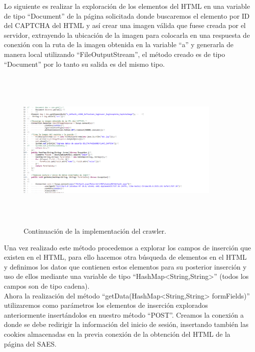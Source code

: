 	\noindent Lo siguiente es realizar la exploración de los elementos del HTML en una variable de tipo “Document” de la página solicitada donde buscaremos el elemento por ID del CAPTCHA del HTML y así crear una imagen válida que fuese creada por el servidor, extrayendo la ubicación de la imagen para colocarla en una respuesta de conexión con la ruta de la imagen obtenida en la variable “a” y generarla de manera local utilizando “FileOutputStream”, el método creado es de tipo “Document” por lo tanto su salida es del mismo tipo. 
	\pagebreak
	
	\begin{figure} [hbt!]
		\centering
		\includegraphics[width=10cm, height=8cm]{Imagenes/Crawler/Codigo2}
		\caption{Continuación de la implementación del crawler.}
		\label{codigo2}
	\end{figure}
	
	\noindent Una vez realizado este método procedemos a explorar los campos de inserción que existen en el HTML, para ello hacemos otra búsqueda de elementos en el HTML y definimos los datos que contienen estos elementos para su posterior inserción y uso de ellos mediante una variable de tipo “HashMap<String,String>” (todos los campos son de tipo cadena).\\
	
	\noindent Ahora la realización del método “getData(HashMap<String,String> formFields)” utilizaremos como parámetros los elementos de inserción explorados anteriormente insertándolos en nuestro método “POST”. Creamos la conexión a donde se debe redirigir la información del inicio de sesión, insertando también las cookies almacenadas en la previa conexión de la obtención del HTML de la página del SAES.\\
	
